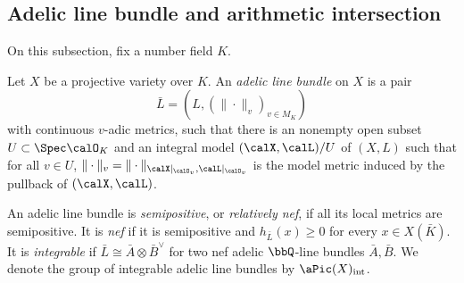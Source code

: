 \subsection[status=draft,tag=0000000,label=\labelNFM{subsec:adelic-line-bundle-and-positivity}]{Adelic line bundle and arithmetic intersection}

On this subsection, fix a number field $K$.
\Yang{}



\begin{definition}[label=\labelNFM{def:adelic-line-bundle-projective-case}, status=draft, tag=0000000]
	Let $X$ be a projective variety over $K$.
	An \emph{adelic line bundle} on $X$ is a pair
	\[ \bar L = (L,(\|\cdot\|_v)_{v \in M_K}) \]
	with continuous $v$-adic metrics, such that there is an nonempty open subset $U \subset \Spec \calO_K$ and an integral model $(\calX,\calL)/U$ of $(X,L)$ such that for all $v \in U$, $\|\cdot\|_v = \|\cdot\|_{\calX|_{\calO_v},\calL|_{\calO_v}}$ is the model metric induced by the pullback of $(\calX,\calL)$.
	\Yang{}
\end{definition}

\begin{definition}[label=\labelNFM{def:positivity-of-adelic-line-bundles}, status=draft, tag=0000000]
	An adelic line bundle is \emph{semipositive}, or \emph{relatively nef}, if all its local metrics are semipositive.
	It is \emph{nef} if it is semipositive and $h_{\bar L}(x) \geq 0$ for every $x \in X(\bar K)$.
	It is \emph{integrable} if $\bar L \cong \bar A \otimes \bar B^\vee$ for two nef adelic $\bbQ$-line bundles $\bar A,\bar B$.
	We denote the group of integrable adelic line bundles by $\aPic(X)_{\mathrm{int}}$.
	\Yang{}
\end{definition}

